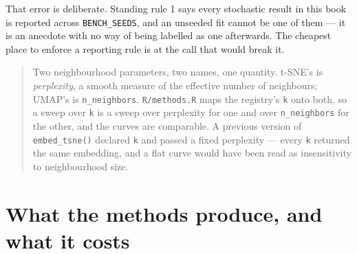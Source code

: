 \documentclass[
  british,
  a4paper,
]{book}
\newenvironment{Shaded}{\begin{snugshade}}{\end{snugshade}}
\newcommand{\AttributeTok}[1]{\textcolor[rgb]{0.13,0.29,0.53}{#1}}
\newcommand{\ControlFlowTok}[1]{\textcolor[rgb]{0.13,0.29,0.53}{\textbf{#1}}}
\newcommand{\DecValTok}[1]{\textcolor[rgb]{0.00,0.00,0.81}{#1}}
\newcommand{\FunctionTok}[1]{\textcolor[rgb]{0.13,0.29,0.53}{\textbf{#1}}}
\newcommand{\NormalTok}[1]{#1}
\newcommand{\OtherTok}[1]{\textcolor[rgb]{0.56,0.35,0.01}{#1}}
\newcommand{\SpecialCharTok}[1]{\textcolor[rgb]{0.81,0.36,0.00}{\textbf{#1}}}
\newcommand{\StringTok}[1]{\textcolor[rgb]{0.31,0.60,0.02}{#1}}
\newenvironment{boximportant}{\begin{quote}}{\end{quote}}
\begin{document}
That error is deliberate. Standing rule 1 says every stochastic result in this
book is reported across \texttt{BENCH\_SEEDS}, and an unseeded fit cannot be one of
them --- it is an anecdote with no way of being labelled as one afterwards. The
cheapest place to enforce a reporting rule is at the call that would break it.

\begin{boximportant}
Two neighbourhood parameters, two names, one quantity. t-SNE's is
\emph{perplexity}, a smooth measure of the effective number of
neighbours; UMAP's is \texttt{n\_neighbors}. \texttt{R/methods.R} maps
the registry's \texttt{k} onto both, so a sweep over \texttt{k} is a
sweep over perplexity for one and over \texttt{n\_neighbors} for the
other, and the curves are comparable. A previous version of
\texttt{embed\_tsne()} declared \texttt{k} and passed a fixed perplexity
--- every \texttt{k} returned the same embedding, and a flat curve would
have been read as insensitivity to neighbourhood size.
\end{boximportant}

\section{What the methods produce, and what it costs}\label{nbr-core}

\begin{Shaded}
\end{Shaded}
\end{document}
